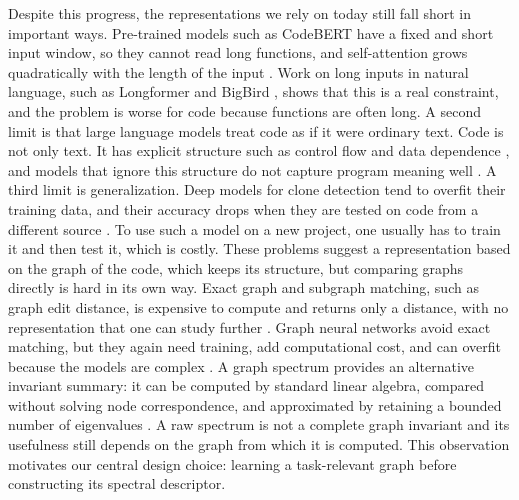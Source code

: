 \documentclass[authoryear,final,5p,times,twocolumn]{elsarticle}
\newcommand{\added}[1]{{\color{green!50!black}#1}}
\theoremstyle{plain}
\begin{document}
Despite this progress, the representations we rely on today still fall short
in important ways. Pre-trained models such as CodeBERT have a fixed and
short input window, so they cannot read long functions, and self-attention grows quadratically with
the length of the input \cite{feng2020codebert,vaswani2017attention}. Work
on long inputs in natural language, such as Longformer
\cite{beltagy2020longformer} and BigBird \cite{zaheer2020bigbird}, shows
that this is a real constraint, and the problem is worse for code because
functions are often long. A second limit is that large language models
treat code as if it were ordinary text. Code is not only text. It has
explicit structure such as control flow and data dependence
\cite{hindle2012naturalness,allamanis2018survey}, and models that ignore
this structure do not capture program meaning well
\cite{chen2021codex,dou2023llmsurvey}. A third limit is generalization.
Deep models for clone detection tend to overfit their training data, and
their accuracy drops when they are tested on code from a different source
\cite{sonnekalb2022generalizability}. To use such a model on a new project,
one usually has to train it and then test it, which is costly. These
problems suggest a representation based on the graph of the code, which
keeps its structure, but comparing graphs directly is hard in its own way.
Exact graph and subgraph matching, such as graph edit distance, is
expensive to compute and returns only a distance, with no representation
that one can study further \cite{komondoor2001slicing}. Graph neural
networks avoid exact matching, but they again need training, add
computational cost, and can overfit because the models are complex
\cite{kipf2017gcn,xu2019gin}. \added{A graph spectrum provides an alternative
invariant summary: it can be computed by standard linear algebra, compared
without solving node correspondence, and approximated by retaining a bounded
number of eigenvalues \cite{chung1997spectral,defferrard2016cnngraph}. A raw
spectrum is not a complete graph invariant and its usefulness still depends on
the graph from which it is computed. This observation motivates our central
design choice: learning a task-relevant graph before constructing its spectral
descriptor.}
\end{document}
